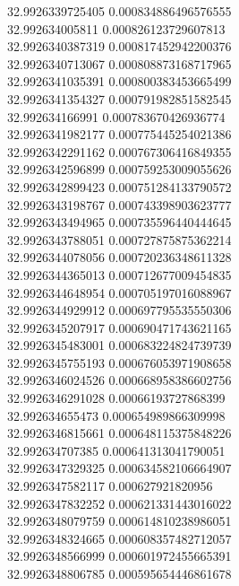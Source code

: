 {32.9926339725405	0.000834886496576555\\
32.992634005811	0.000826123729607813\\
32.9926340387319	0.000817452942200376\\
32.9926340713067	0.000808873168717965\\
32.9926341035391	0.000800383453665499\\
32.9926341354327	0.000791982851582545\\
32.992634166991	0.000783670426936774\\
32.9926341982177	0.000775445254021386\\
32.9926342291162	0.000767306416849355\\
32.9926342596899	0.000759253009055626\\
32.9926342899423	0.000751284133790572\\
32.9926343198767	0.000743398903623777\\
32.9926343494965	0.000735596440444645\\
32.9926343788051	0.000727875875362214\\
32.9926344078056	0.000720236348611328\\
32.9926344365013	0.000712677009454835\\
32.9926344648954	0.000705197016088967\\
32.9926344929912	0.000697795535550306\\
32.9926345207917	0.000690471743621165\\
32.9926345483001	0.000683224824739739\\
32.9926345755193	0.000676053971908658\\
32.9926346024526	0.000668958386602756\\
32.9926346291028	0.00066193727868399\\
32.992634655473	0.000654989866309998\\
32.9926346815661	0.000648115375848226\\
32.992634707385	0.000641313041790051\\
32.9926347329325	0.000634582106664907\\
32.9926347582117	0.000627921820956\\
32.9926347832252	0.000621331443016022\\
32.9926348079759	0.000614810238986051\\
32.9926348324665	0.000608357482712057\\
32.9926348566999	0.000601972455665391\\
32.9926348806785	0.000595654446861678\\
}
